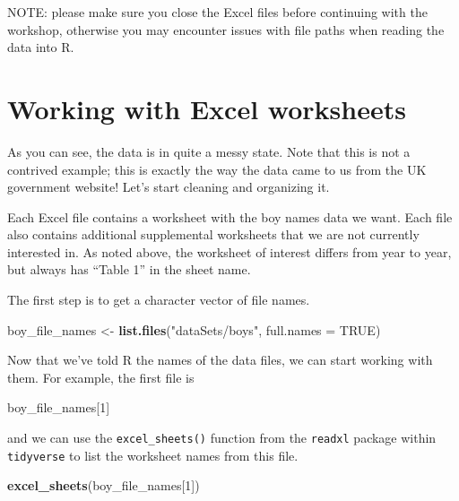 \documentclass[]{book}
\newenvironment{Shaded}{\begin{snugshade}}{\end{snugshade}}
\newcommand{\KeywordTok}[1]{\textcolor[rgb]{0.13,0.29,0.53}{\textbf{#1}}}
\newcommand{\DataTypeTok}[1]{\textcolor[rgb]{0.13,0.29,0.53}{#1}}
\newcommand{\DecValTok}[1]{\textcolor[rgb]{0.00,0.00,0.81}{#1}}
\newcommand{\StringTok}[1]{\textcolor[rgb]{0.31,0.60,0.02}{#1}}
\newcommand{\OtherTok}[1]{\textcolor[rgb]{0.56,0.35,0.01}{#1}}
\newcommand{\NormalTok}[1]{#1}
\begin{document}
NOTE: please make sure you close the Excel files before continuing with
the workshop, otherwise you may encounter issues with file paths when
reading the data into R.

\section{Working with Excel
worksheets}\label{working-with-excel-worksheets}

As you can see, the data is in quite a messy state. Note that this is
not a contrived example; this is exactly the way the data came to us
from the UK government website! Let's start cleaning and organizing it.

Each Excel file contains a worksheet with the boy names data we want.
Each file also contains additional supplemental worksheets that we are
not currently interested in. As noted above, the worksheet of interest
differs from year to year, but always has ``Table 1'' in the sheet name.

The first step is to get a character vector of file names.

\begin{Shaded}
\begin{Highlighting}[]
\NormalTok{boy_file_names <-}\StringTok{ }\KeywordTok{list.files}\NormalTok{(}\StringTok{"dataSets/boys"}\NormalTok{, }\DataTypeTok{full.names =} \OtherTok{TRUE}\NormalTok{)}
\end{Highlighting}
\end{Shaded}

Now that we've told R the names of the data files, we can start working
with them. For example, the first file is

\begin{Shaded}
\begin{Highlighting}[]
\NormalTok{boy_file_names[}\DecValTok{1}\NormalTok{]}
\end{Highlighting}
\end{Shaded}

and we can use the \texttt{excel\_sheets()} function from the
\texttt{readxl} package within \texttt{tidyverse} to list the worksheet
names from this file.

\begin{Shaded}
\begin{Highlighting}[]
\KeywordTok{excel_sheets}\NormalTok{(boy_file_names[}\DecValTok{1}\NormalTok{])}
\end{Highlighting}
\end{Shaded}
\end{document}
